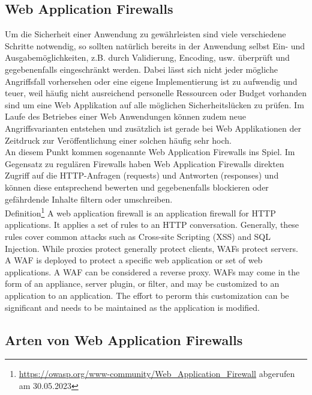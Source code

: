\subsection{Web Application Firewalls}
Um die Sicherheit einer Anwendung zu gewährleisten sind viele verschiedene Schritte notwendig, so sollten natürlich bereits in der Anwendung selbst Ein- und Ausgabemöglichkeiten, z.B. durch Validierung, Encoding, usw. überprüft und gegebenenfalls eingeschränkt werden. Dabei lässt sich nicht jeder mögliche Angriffsfall vorhersehen oder eine eigene Implementierung ist zu aufwendig und teuer, weil häufig nicht ausreichend personelle Ressourcen oder Budget vorhanden sind um eine Web Applikation auf alle möglichen Sicherheitslücken zu prüfen. Im Laufe des Betriebes einer Web Anwendungen können zudem neue Angriffsvarianten entstehen und zusätzlich ist gerade bei Web Applikationen der Zeitdruck zur Veröffentlichung einer solchen häufig sehr hoch.\\

An diesem Punkt kommen sogenannte Web Application Firewalls ins Spiel. Im Gegensatz zu regulären Firewalls haben Web Application Firewalls direkten Zugriff auf die HTTP-Anfragen (requests) und Antworten (responses) und können diese entsprechend bewerten und gegebenenfalls blockieren oder gefährdende Inhalte filtern oder umschreiben.\\

\textcolor{bhtGray}{ Definition\footnote{\url{https://owasp.org/www-community/Web_Application_Firewall} abgerufen am 30.05.2023}} A web application firewall is an application firewall for HTTP applications. It applies a set of rules to an HTTP conversation. Generally, these rules cover common attacks such as Cross-site Scripting (XSS) and SQL Injection. While proxies protect generally protect clients, WAFs protect servers. A WAF is deployed to protect a specific web application or set of web applications. A WAF can be considered a reverse proxy. WAFs may come in the form of an appliance, server plugin, or filter, and may be customized to an application to an application. The effort to perorm this customization can be significant and needs to be maintained as the application is modified.


\subsection{Arten von Web Application Firewalls}

